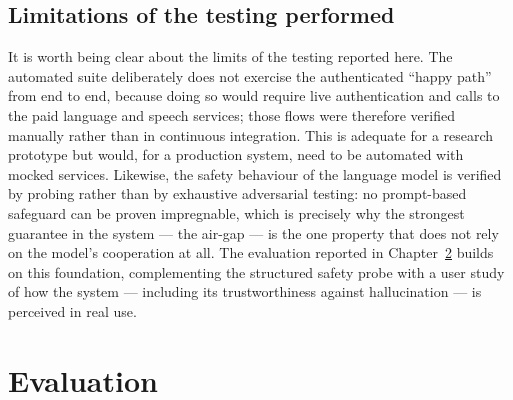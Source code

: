 \documentclass[11pt,a4paper]{report}
\begin{document}
\section{Limitations of the testing performed}
It is worth being clear about the limits of the testing reported here. The automated suite deliberately does not exercise the authenticated ``happy path'' from end to end, because doing so would require live authentication and calls to the paid language and speech services; those flows were therefore verified manually rather than in continuous integration. This is adequate for a research prototype but would, for a production system, need to be automated with mocked services. Likewise, the safety behaviour of the language model is verified by probing rather than by exhaustive adversarial testing: no prompt-based safeguard can be proven impregnable, which is precisely why the strongest guarantee in the system --- the air-gap --- is the one property that does not rely on the model's cooperation at all. The evaluation reported in Chapter~\ref{ch:eval} builds on this foundation, complementing the structured safety probe with a user study of how the system --- including its trustworthiness against hallucination --- is perceived in real use.

\chapter{Evaluation}
\label{ch:eval}
\end{document}
